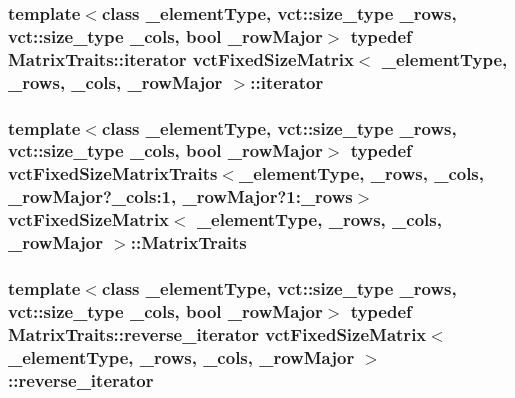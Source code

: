 \subsubsection[{iterator}]{\setlength{\rightskip}{0pt plus 5cm}template$<$class \+\_\+element\+Type, vct\+::size\+\_\+type \+\_\+rows, vct\+::size\+\_\+type \+\_\+cols, bool \+\_\+row\+Major$>$ typedef {\bf Matrix\+Traits\+::iterator} {\bf vct\+Fixed\+Size\+Matrix}$<$ \+\_\+element\+Type, \+\_\+rows, \+\_\+cols, \+\_\+row\+Major $>$\+::{\bf iterator}}\label{classvct_fixed_size_matrix_a3512c7acacb6065a802898949cb78f43}
\hypertarget{classvct_fixed_size_matrix_a29b71912a8827d4baca637aebfe41eca}{}
\subsubsection[{Matrix\+Traits}]{\setlength{\rightskip}{0pt plus 5cm}template$<$class \+\_\+element\+Type, vct\+::size\+\_\+type \+\_\+rows, vct\+::size\+\_\+type \+\_\+cols, bool \+\_\+row\+Major$>$ typedef {\bf vct\+Fixed\+Size\+Matrix\+Traits}$<$\+\_\+element\+Type, \+\_\+rows, \+\_\+cols, \+\_\+row\+Major?\+\_\+cols\+:1, \+\_\+row\+Major?1\+:\+\_\+rows$>$ {\bf vct\+Fixed\+Size\+Matrix}$<$ \+\_\+element\+Type, \+\_\+rows, \+\_\+cols, \+\_\+row\+Major $>$\+::{\bf Matrix\+Traits}}\label{classvct_fixed_size_matrix_a29b71912a8827d4baca637aebfe41eca}
\hypertarget{classvct_fixed_size_matrix_afd9b320069fbb9b20f3dc11d767b57c9}{}
\subsubsection[{reverse\+\_\+iterator}]{\setlength{\rightskip}{0pt plus 5cm}template$<$class \+\_\+element\+Type, vct\+::size\+\_\+type \+\_\+rows, vct\+::size\+\_\+type \+\_\+cols, bool \+\_\+row\+Major$>$ typedef {\bf Matrix\+Traits\+::reverse\+\_\+iterator} {\bf vct\+Fixed\+Size\+Matrix}$<$ \+\_\+element\+Type, \+\_\+rows, \+\_\+cols, \+\_\+row\+Major $>$\+::{\bf reverse\+\_\+iterator}}\label{classvct_fixed_size_matrix_afd9b320069fbb9b20f3dc11d767b57c9}
\hypertarget{classvct_fixed_size_matrix_a45edd9a8b579712a59b766f04e1acfec}{}

